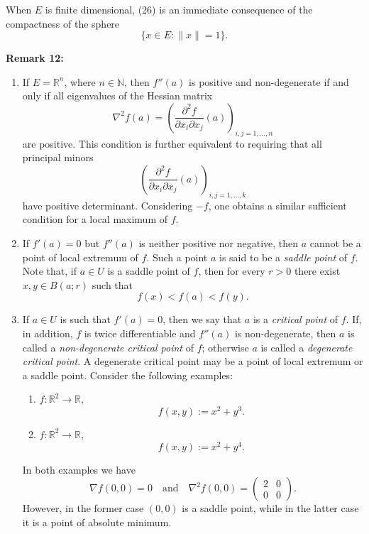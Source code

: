 \documentclass{book}
\begin{document}
When $E$ is finite dimensional, (26) is an immediate consequence
of the compactness of the sphere
\[
\{x \in E : \|x\|=1\}.
\]

\textbf{Remark 12:}

\begin{enumerate}
\item
If $E=\mathbb{R}^n$, where $n \in \mathbb{N}$, then $f''(a)$ is positive and
non-degenerate if and only if all eigenvalues of the Hessian matrix
\[
\nabla^2 f(a)
=
\left(
\frac{\partial^2 f}{\partial x_i \partial x_j}(a)
\right)_{i,j=1,\dots,n}
\]
are positive. This condition is further equivalent to requiring that all
principal minors
\[
\left(
\frac{\partial^2 f}{\partial x_i \partial x_j}(a)
\right)_{i,j=1,\dots,k}
\]
have positive determinant. Considering $-f$, one obtains a similar sufficient
condition for a local maximum of $f$.

\item
If $f'(a)=0$ but $f''(a)$ is neither positive nor negative, then $a$
cannot be a point of local extremum of $f$. Such a point $a$ is said to be
a \emph{saddle point} of $f$. Note that, if $a \in U$ is a saddle point of $f$,
then for every $r>0$ there exist $x,y \in B(a;r)$ such that
\[
f(x) < f(a) < f(y).
\]

\item
If $a \in U$ is such that $f'(a)=0$, then we say that $a$ is a
\emph{critical point} of $f$. If, in addition, $f$ is twice differentiable
and $f''(a)$ is non-degenerate, then $a$ is called a
\emph{non-degenerate critical point} of $f$; otherwise $a$ is called a
\emph{degenerate critical point}. A degenerate critical point may be a
point of local extremum or a saddle point. Consider the following examples:
\begin{enumerate}
\item $f : \mathbb{R}^2 \to \mathbb{R}$,
\[
f(x,y) := x^2 + y^3.
\]
\item $f : \mathbb{R}^2 \to \mathbb{R}$,
\[
f(x,y) := x^2 + y^4.
\]
\end{enumerate}

In both examples we have
\[
\nabla f(0,0)=0
\quad \text{and} \quad
\nabla^2 f(0,0)
=
\begin{pmatrix}
2 & 0 \\
0 & 0
\end{pmatrix}.
\]
However, in the former case $(0,0)$ is a saddle point, while in the latter
case it is a point of absolute minimum.
\end{enumerate}
\end{document}
